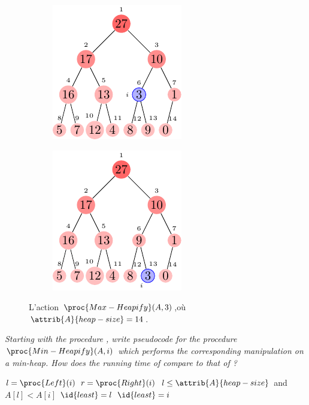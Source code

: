 \begin{description}
\begin{ex}
\begin{figure}[H]
        \begin{subfigure}[t]{.45\textwidth}
          \centering
          \includegraphics[scale=1.4]{img/6_2-1/6_2-1_2}
          \caption{}\label{fig:6_2-1_2}
        \end{subfigure}
        \begin{subfigure}[t]{.45\textwidth}
          \centering
          \includegraphics[scale=1.4]{img/6_2-1/6_2-1_3}
          \caption{}\label{fig:6_2-1_3}
        \end{subfigure}
        \caption{L'action $\proc{Max-Heapify}(A,3)$,o\`u $\attrib{A}{heap-size}= 14$.} 
        \label{fig:Heapify}
      \end{figure}
    \end{ex}
   \textit{Starting with the procedure , write pseudocode for the procedure $\proc{Min-Heapify}(A,i)$ which performs the corresponding manipulation on a min-heap. How does the running time of  compare to that of  ?}
    \begin{ex}
      \begin{codebox}
        \li $l = \proc{Left}(i)$
        \li $r = \proc{Right}(i)$
        \li \If $l \le \attrib{A}{heap-size}$ and $A[l] < A[i]$ \Do
        \li $\id{least} = l$        
        \li \Else $\id{least} = i$ \End

\end{codebox}
\end{ex}
\end{description}
